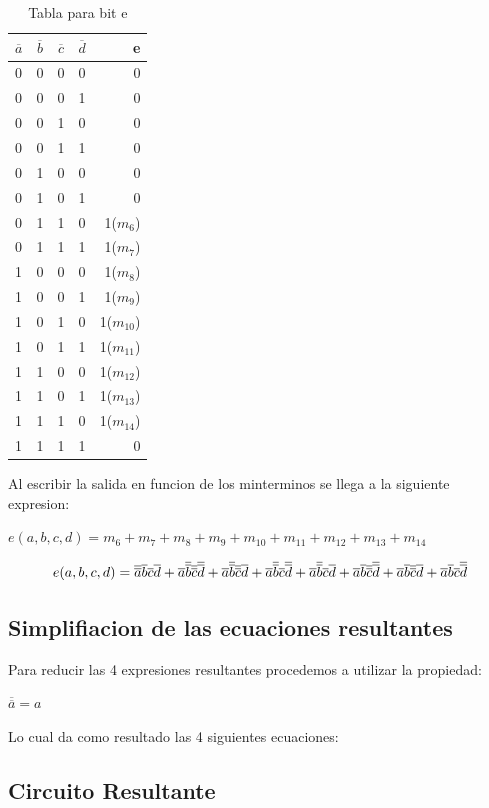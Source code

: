 \documentclass{article}
\begin{document}
			\begin{table}[h!]
			\begin{center}
				\caption{Tabla para bit e}
				\begin{tabular}{l|c|c|c|r}
				\textbf{$\overline{a}$} & \textbf{$\overline{b}$} & \textbf{$\overline{c}$} & \textbf{$\overline{d}$} & \textbf{e}\\
				\hline
				0 & 0 & 0 & 0 & 0\\
				0 & 0 & 0 & 1 & 0\\	
				0 & 0 & 1 & 0 & 0\\
				0 & 0 & 1 & 1 & 0\\
				0 & 1 & 0 & 0 & 0\\
				0 & 1 & 0 & 1 & 0\\	
				0 & 1 & 1 & 0 & 1($m_{6}$)\\
				0 & 1 & 1 & 1 & 1($m_{7}$)\\		
				1 & 0 & 0 & 0 & 1($m_{8}$)\\
				1 & 0 & 0 & 1 & 1($m_{9}$)\\	
				1 & 0 & 1 & 0 & 1($m_{10}$)\\
				1 & 0 & 1 & 1 & 1($m_{11}$)\\
				1 & 1 & 0 & 0 & 1($m_{12}$)\\
				1 & 1 & 0 & 1 & 1($m_{13}$)\\	
				1 & 1 & 1 & 0 & 1($m_{14}$)\\
				1 & 1 & 1 & 1 & 0\\			
				\end{tabular}
			\end{center}
		\end{table}
		\newline Al escribir la salida en funcion de los minterminos se llega a la siguiente expresion:
		\newline \centerline{$e(a,b,c,d)=m_{6}+m_{7}+m_{8}+m_{9}+m_{10}+m_{11}+m_{12}+m_{13}+m_{14}$}
		\begin{equation}
			\centerline{$e(a,b,c,d)=\overline{\overline{a}}\overline{b}\overline{c}\overline{d}+\overline{a}\overline{\overline{b}}\overline{\overline{c}}\overline{\overline{d}}+\overline{a}\overline{\overline{b}}\overline{\overline{c}}\overline{d}+\overline{a}\overline{\overline{b}}\overline{c}\overline{\overline{d}}+\overline{a}\overline{\overline{b}}\overline{c}\overline{d}+\overline{a}\overline{b}\overline{\overline{c}}\overline{\overline{d}}+\overline{a}\overline{b}\overline{\overline{c}}\overline{d}+\overline{a}\overline{b}\overline{c}\overline{\overline{d}}$}
		\end{equation}
	\subsection{Simplifiacion de las ecuaciones resultantes}
		\hspace{10mm} Para reducir las 4 expresiones resultantes procedemos a utilizar la propiedad:
		\newline \centerline{$\overline{\overline{a}}=a$}
		Lo cual da como resultado las 4 siguientes ecuaciones:
	\subsection{Circuito Resultante}
		
\end{document}
